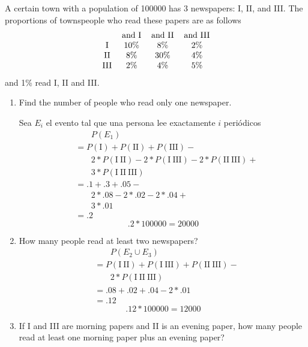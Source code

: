 \item A certain town with a population of 100000 has 3 newspapers: I, II, and III. The proportions of townspeople who read these papers are as follows
\[ 
\begin{tabular}{cccc}
     & and I & and II & and III \\
    I & 10\% & 8\% & 2\% \\
    II & 8\% & 30\% & 4\%\\
    III & 2\% & 4\% & 5\%
\end{tabular}
\]
and 1\% read I, II and III.
\begin{enumerate}
    \item Find the number of people who read only one newspaper.

    Sea $E_{i}$ el evento tal que una persona lee exactamente $i$ periódicos
    \begin{align*}
        &\phantom{\;=\;}P(E_1)\\
        &= P(\text{I}) + P(\text{II}) + P(\text{III}) - {}\\
        &\phantom{\;=\;} 2 * P(\text{I}\ \text{II}) - 2 * P(\text{I}\ \text{III}) - 2 * P(\text{II}\ \text{III}) +{}\\
        &\phantom{\;=\;} 3 * P(\text{I}\ \text{II}\ \text{III})\\
        &= .1 + .3 + .05 - {}\\
        &\phantom{\;=\;} 2 * .08 - 2 * .02 - 2 * .04 + {}\\
        &\phantom{\;=\;}3 * .01\\
        &= .2
    \end{align*}
    \[ .2 * 100000 = 20000 \]
    \item How many people read at least two newspapers?
    \begin{align*}
        &\phantom{\;=\;} P(E_2\cup E_3)\\
        &= P(\text{I}\ \text{II}) + P(\text{I}\ \text{III}) + P(\text{II}\ \text{III}) - {}\\
        &\phantom{\;=\;} 2 * P(\text{I}\ \text{II}\ \text{III})\\
        &= .08 + .02 + .04 - 2 * .01\\
        &= .12
    \end{align*}
    \[ .12 * 100000 = 12000 \]
    \item If I and III are morning papers and II is an evening paper, how many people read at least one morning paper plus an evening paper?
    \begin{align*}

\end{align*}
\end{enumerate}
